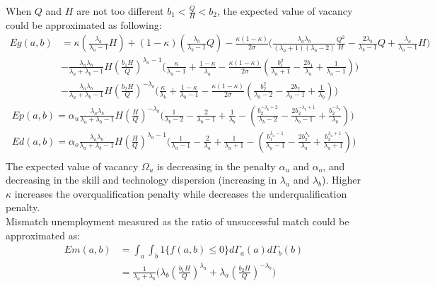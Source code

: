 \documentclass{article}
\newcommand{\1}{\mathbb{1}}
\begin{document}
When $Q$ and $H$ are not too different $b_1<\frac{Q}{H}<b_2$, the expected value of vacancy could be approximated as following: 
\begin{align*}
Eg(a,b) &= \kappa(\frac{\lambda_a}{\lambda_a-1}H)+(1-\kappa)(\frac{\lambda_b}{\lambda_b-1}Q)-\frac{\kappa(1-\kappa)}{2\sigma}\Big(\frac{\lambda_a\lambda_b}{(\lambda_a+1)(\lambda_b-2)}\frac{Q^2}{H}-\frac{2\lambda_b}{\lambda_b-1}Q+\frac{\lambda_a}{\lambda_a-1}H\Big) \\
&-\frac{\lambda_a\lambda_b}{\lambda_a+\lambda_b-1}H(\frac{b_1H}{Q})^{\lambda_a-1}\Big(\frac{\kappa}{\lambda_a-1}+\frac{1-\kappa}{\lambda_a}-\frac{\kappa(1-\kappa)}{2\sigma}(\frac{b_1^2}{\lambda_a+1}-\frac{2b_1}{\lambda_a}+\frac{1}{\lambda_a-1})\Big) \\
&-\frac{\lambda_a\lambda_b}{\lambda_a+\lambda_b-1}H(\frac{b_2H}{Q})^{-\lambda_b}\Big(\frac{\kappa}{\lambda_b}+\frac{1-\kappa}{\lambda_b-1}-\frac{\kappa(1-\kappa)}{2\sigma}(\frac{b_2^2}{\lambda_b-2}-\frac{2b_2}{\lambda_b-1}+\frac{1}{\lambda_b})\Big)
\end{align*}
\begin{align*}
Ep(a,b) = \alpha_u\frac{\lambda_a\lambda_b}{\lambda_a+\lambda_b-1}H(\frac{H}{Q})^{-\lambda_b}\Big(\frac{1}{\lambda_b-2}-\frac{2}{\lambda_b-1}+\frac{1}{\lambda_b}-(\frac{b_2^{-\lambda_b+2}}{\lambda_b-2}-\frac{2b_2^{-\lambda_b+1}}{\lambda_b-1}+\frac{b_2^{-\lambda_b}}{\lambda_b})\Big) \\
Ed(a,b) = \alpha_o\frac{\lambda_a\lambda_b}{\lambda_a+\lambda_b-1}H(\frac{H}{Q})^{\lambda_a-1}\Big(\frac{1}{\lambda_a-1}-\frac{2}{\lambda_a}+\frac{1}{\lambda_a+1}-(\frac{b_1^{\lambda_a-1}}{\lambda_a-1}-\frac{2b_2^{\lambda_a}}{\lambda_a}+\frac{b_2^{\lambda_a+1}}{\lambda_a+1})\Big) \\
\end{align*}
The expected value of vacancy $\Omega_u$ is decreasing in the penalty $\alpha_u$ and $\alpha_o$, and decreasing in the skill and technology dispersion (increasing in $\lambda_a$ and $\lambda_b$). Higher $\kappa$ increases the overqualification penalty while decreases the underqualification penalty. \\

Mismatch unemployment measured as the ratio of unsuccessful match could be approximated as: 
\begin{align*}
Em(a,b) &= \int_a\int_b 1\{f(a,b) \leq 0\}d\Gamma_a(a)d\Gamma_b(b) \\
&= \frac{1}{\lambda_a+\lambda_b}\big(\lambda_b(\frac{b_1H}{Q})^{\lambda_a}+\lambda_a(\frac{b_2H}{Q})^{-\lambda_b}\big)
\end{align*}
\end{document}
